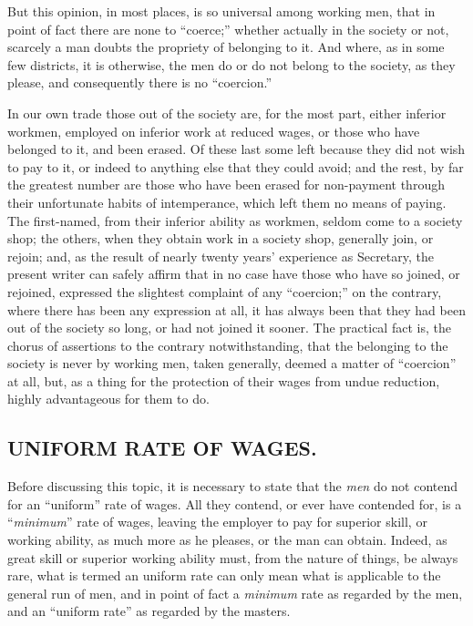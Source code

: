 But this opinion, in most places, is so universal among working men,
that in point of fact there are none to ``coerce;'' whether actually in
the society or not, scarcely a man doubts the propriety of belonging to
it. And where, as in some few districts, it is otherwise, the men do or
do not belong to the society, as they please, and consequently there is
no ``coercion.''

In our own trade those out of the society are, for the most part, either
inferior workmen, employed on inferior work at reduced wages, or those
who have belonged to it, and been erased. Of these last some left
because they did not wish to pay to it, or indeed to anything else that
they could avoid; and the rest, by far the greatest number are those who
have been erased for non-payment through their unfortunate habits of
intemperance, which left them no means of paying. The first-named, from
their inferior ability as workmen, seldom come to a society shop; the
others, when they obtain work in a society shop, generally join, or
rejoin; and, as the result of nearly twenty years' experience as
Secretary, the present writer can safely affirm that in no case have
those who have so joined, or rejoined, expressed the slightest complaint
of any ``coercion;'' on the contrary, where there has been any
expression at all, it has always been that they had been out of the
society so long, or had not joined it sooner. The practical fact is, the
chorus of assertions to the contrary notwithstanding, that the belonging
to the society is never by working men, taken generally, deemed a matter
of ``coercion'' at all, but, as a thing for the protection of their
wages from undue reduction, highly advantageous for them to do.

\subsection{UNIFORM RATE OF WAGES.}

Before discussing this topic, it is necessary to state that the
\textit{men} do not contend for an ``uniform'' rate of wages. All they
contend, or ever have contended for, is a ``\textit{minimum}'' rate of
wages, leaving the employer to pay for superior skill, or working
ability, as much more as he pleases, or the man can obtain. Indeed, as
great skill or superior working ability must, from the nature of things,
be always rare, what is termed an uniform rate can only mean what is
applicable to the general run of men, and in point of fact a
\textit{minimum} rate as regarded by the men, and an ``uniform rate'' as
regarded by the masters.

